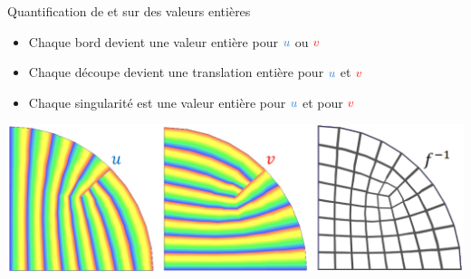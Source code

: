 \begin{frame}{Quantification de  et  sur des valeurs entières}
    \begin{itemize}
        \item Chaque bord devient une valeur entière pour $\blue{u}$ ou ${\color{red}v}$
        \item Chaque découpe devient une translation entière pour $\blue{u}$ et ${\color{red}v}$
        \item Chaque singularité est une valeur entière pour $\blue{u}$ et pour ${\color{red}v}$
    \end{itemize}
    
    \vspace{1em} %
    \centering
    \includegraphics[width=\linewidth]{img/new_images/uv_quantizee.png}
\end{frame}